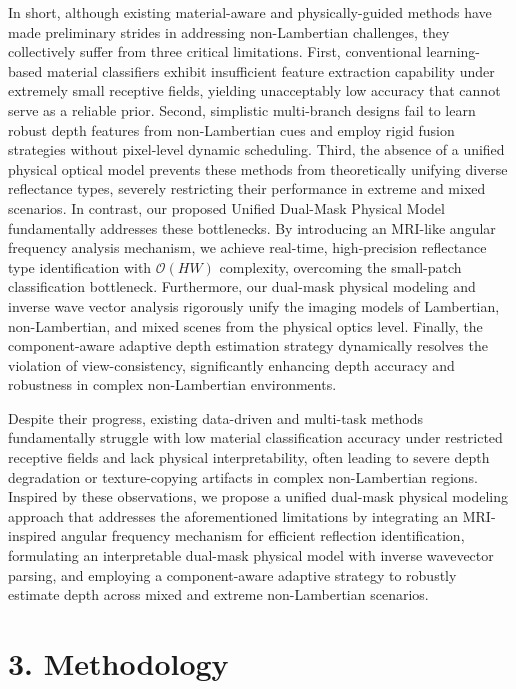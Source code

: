 \documentclass[journal]{IEEEtran}
\begin{document}
In short, although existing material-aware and physically-guided methods have made preliminary strides in addressing non-Lambertian challenges, they collectively suffer from three critical limitations. First, conventional learning-based material classifiers exhibit insufficient feature extraction capability under extremely small receptive fields, yielding unacceptably low accuracy that cannot serve as a reliable prior. Second, simplistic multi-branch designs fail to learn robust depth features from non-Lambertian cues and employ rigid fusion strategies without pixel-level dynamic scheduling. Third, the absence of a unified physical optical model prevents these methods from theoretically unifying diverse reflectance types, severely restricting their performance in extreme and mixed scenarios. In contrast, our proposed Unified Dual-Mask Physical Model fundamentally addresses these bottlenecks. By introducing an MRI-like angular frequency analysis mechanism, we achieve real-time, high-precision reflectance type identification with \(\mathcal{O}(HW)\) complexity, overcoming the small-patch classification bottleneck. Furthermore, our dual-mask physical modeling and inverse wave vector analysis rigorously unify the imaging models of Lambertian, non-Lambertian, and mixed scenes from the physical optics level. Finally, the component-aware adaptive depth estimation strategy dynamically resolves the violation of view-consistency, significantly enhancing depth accuracy and robustness in complex non-Lambertian environments.

Despite their progress, existing data-driven and multi-task methods fundamentally struggle with low material classification accuracy under restricted receptive fields and lack physical interpretability, often leading to severe depth degradation or texture-copying artifacts in complex non-Lambertian regions. Inspired by these observations, we propose a unified dual-mask physical modeling approach that addresses the aforementioned limitations by integrating an MRI-inspired angular frequency mechanism for efficient reflection identification, formulating an interpretable dual-mask physical model with inverse wavevector parsing, and employing a component-aware adaptive strategy to robustly estimate depth across mixed and extreme non-Lambertian scenarios.

\section{3. Methodology}
\end{document}
